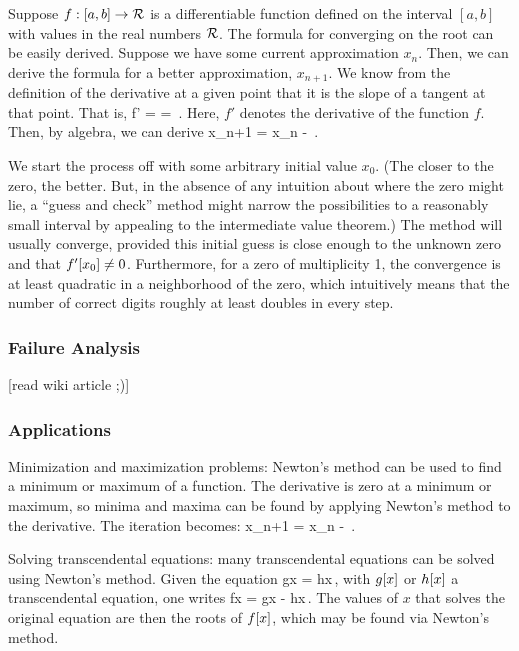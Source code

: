 Suppose ${f}:{[a,b]}\to{\mathcal{R}}$ is a differentiable function defined on the interval $[a,b]$ with values in the real numbers $\mathcal{R}$. The formula for converging on the root can be easily derived. Suppose we have some current approximation $x_n$. Then, we can derive the formula for a better approximation, $x_{n+1}$. We know from the definition of the derivative at a given point that it is the slope of a tangent at that point. That is,
\beq
f' =  = \,.
\eeq
Here, $f'$ denotes the derivative of the function $f$. Then, by algebra, we can derive
\beq
x_{n+1} = x_n - \,.
\eeq

We start the process off with some arbitrary initial value $x_0$. (The closer to the zero, the better. But, in the absence of any intuition about where the zero might lie, a ``guess and check'' method might narrow the possibilities to a reasonably small interval by appealing to the intermediate value theorem.) The method will usually converge, provided this initial guess is close enough to the unknown zero and that $f'\!\left[{x_0}\right]\neq 0$. Furthermore, for a zero of multiplicity 1, the convergence is at least quadratic in a neighborhood of the zero, which intuitively means that the number of correct digits roughly at least doubles in every step.


\subsubsection{Failure Analysis}
[read wiki article ;)]


\subsubsection{Applications}
Minimization and maximization problems: Newton's method can be used to find a minimum or maximum of a function. The derivative is zero at a minimum or maximum, so minima and maxima can be found by applying Newton's method to the derivative. The iteration becomes:
\beq
x_{n+1} = x_n - \,.
\eeq

Solving transcendental equations: many transcendental equations can be solved using Newton's method. Given the equation
\beq
g\vat x = h\vat x\,,
\eeq
with $g\!\left[{x}\right]$ or $h\!\left[{x}\right]$ a transcendental equation, one writes
\beq
f\vat x = g\vat x - h\vat x\,.
\eeq
The values of $x$ that solves the original equation are then the roots of $f\!\left[{x}\right]$, which may be found via Newton's method.


